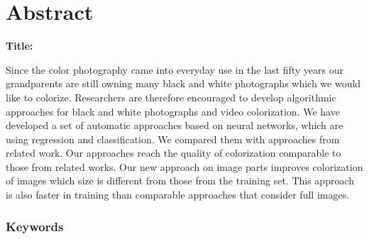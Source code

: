 \chapter*{Abstract}

\noindent\textbf{Title:} \ttitleEn
\bigskip

Since the color photography came into everyday use in the last fifty years our grandparents are still owning many black and white photographs which we would like to colorize. Researchers are therefore encouraged to develop algorithmic approaches for black and white photographs and video colorization.  
We have developed a set of automatic approaches based on neural networks, which are using regression and classification. We compared them with approaches from related work.  
Our approaches reach the quality of colorization comparable to those from related works. Our new approach on image parts improves colorization of images which size is different from those from the training set. This approach is also faster in training than comparable approaches that consider full images.


\subsection*{Keywords}
\textit{\tkeywordsEn}
\clearemptydoublepage